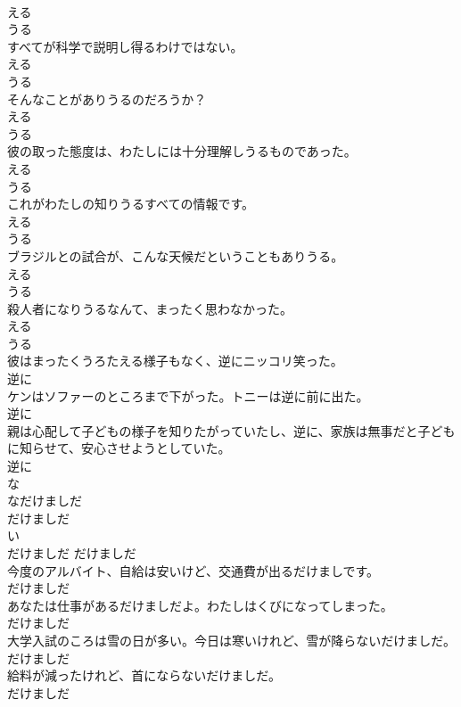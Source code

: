 \documentclass[8pt]{extreport}
\begin{document}
\begin{CJK}{UTF8}{min}
\\	える 
\\	うる
\\	すべてが科学で説明し得るわけではない。	
\\	える 
\\	うる
\\	そんなことがありうるのだろうか？	
\\	える 
\\	うる
\\	彼の取った態度は、わたしには十分理解しうるものであった。	
\\	える 
\\	うる
\\	これがわたしの知りうるすべての情報です。	
\\	える 
\\	うる
\\	ブラジルとの試合が、こんな天候だということもありうる。	
\\	える 
\\	うる
\\	殺人者になりうるなんて、まったく思わなかった。	
\\	える 
\\	うる
\\	彼はまったくうろたえる様子もなく、逆にニッコリ笑った。	
\\	逆に
\\	ケンはソファーのところまで下がった。トニーは逆に前に出た。	
\\	逆に
\\	親は心配して子どもの様子を知りたがっていたし、逆に、家族は無事だと子どもに知らせて、安心させようとしていた。	
\\	逆に
\\	な
\\	なだけましだ	
\\	だけましだ	
\\	い
\\	だけましだ	だけましだ
\\	今度のアルバイト、自給は安いけど、交通費が出るだけましです。	
\\	だけましだ
\\	あなたは仕事があるだけましだよ。わたしはくびになってしまった。	
\\	だけましだ
\\	大学入試のころは雪の日が多い。今日は寒いけれど、雪が降らないだけましだ。	
\\	だけましだ
\\	給料が減ったけれど、首にならないだけましだ。	
\\	だけましだ

\end{CJK}
\end{document}

